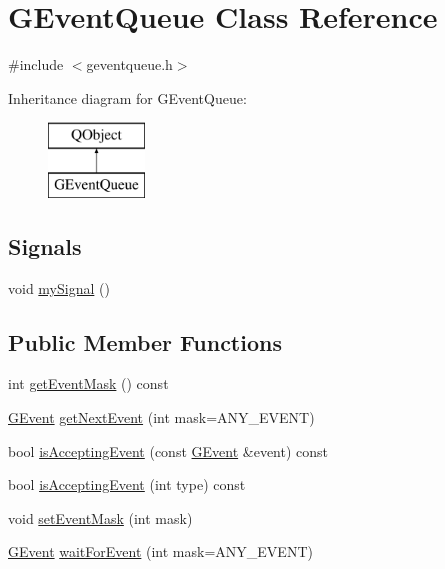 \hypertarget{classGEventQueue}{}\section{G\+Event\+Queue Class Reference}
\label{classGEventQueue}


{\ttfamily \#include $<$geventqueue.\+h$>$}

Inheritance diagram for G\+Event\+Queue\+:\begin{figure}[H]
\begin{center}
\leavevmode
\includegraphics[height=2.000000cm]{classGEventQueue}
\end{center}
\end{figure}
\subsection*{Signals}
\begin{DoxyCompactItemize}
\item 
void \mbox{\hyperlink{classGEventQueue_a2bcfdc8e485c8204ce10442882aa3563}{my\+Signal}} ()
\end{DoxyCompactItemize}
\subsection*{Public Member Functions}
\begin{DoxyCompactItemize}
\item 
int \mbox{\hyperlink{classGEventQueue_a79a9b73923bc67a3e403fab69fc10353}{get\+Event\+Mask}} () const
\item 
\mbox{\hyperlink{classGEvent}{G\+Event}} \mbox{\hyperlink{classGEventQueue_a2cc1dab98b5712012e365c8afdc04bc4}{get\+Next\+Event}} (int mask=A\+N\+Y\+\_\+\+E\+V\+E\+NT)
\item 
bool \mbox{\hyperlink{classGEventQueue_aa31c73145a29dcb92848a92e0cfaea41}{is\+Accepting\+Event}} (const \mbox{\hyperlink{classGEvent}{G\+Event}} \&event) const
\item 
bool \mbox{\hyperlink{classGEventQueue_abde37ac702cc10b38163ecfda52fa47e}{is\+Accepting\+Event}} (int type) const
\item 
void \mbox{\hyperlink{classGEventQueue_adce9f96a4206731f1ad97a8f08868358}{set\+Event\+Mask}} (int mask)
\item 
\mbox{\hyperlink{classGEvent}{G\+Event}} \mbox{\hyperlink{classGEventQueue_ac49283a36a844e5c07ce0b199f481c9f}{wait\+For\+Event}} (int mask=A\+N\+Y\+\_\+\+E\+V\+E\+NT)
\end{DoxyCompactItemize}
